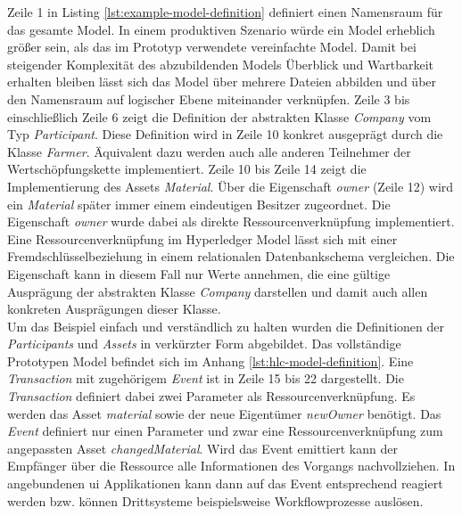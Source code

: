 \noindent
Zeile 1 in Listing \ref{lst:example-model-definition} definiert einen Namensraum für das gesamte Model. In einem produktiven Szenario würde ein Model erheblich größer sein, als das im Prototyp verwendete vereinfachte Model. Damit bei steigender Komplexität des abzubildenden Models Überblick und Wartbarkeit erhalten bleiben lässt sich das Model über mehrere Dateien abbilden und über den Namensraum auf logischer Ebene miteinander verknüpfen. Zeile 3 bis einschließlich Zeile 6 zeigt die Definition der abstrakten Klasse \textit{Company} vom Typ \textit{Participant}. Diese Definition wird in Zeile 10 konkret ausgeprägt durch die Klasse \textit{Farmer}. Äquivalent dazu werden auch alle anderen Teilnehmer der Wertschöpfungskette implementiert. Zeile 10 bis Zeile 14 zeigt die Implementierung des Assets \textit{Material}. Über die Eigenschaft \textit{owner} (Zeile 12) wird ein \textit{Material} später immer einem eindeutigen Besitzer zugeordnet. Die Eigenschaft \textit{owner} wurde dabei als direkte Ressourcenverknüpfung implementiert. Eine Ressourcenverknüpfung im Hyperledger Model lässt sich mit einer Fremdschlüsselbeziehung in einem relationalen Datenbankschema vergleichen. Die Eigenschaft kann in diesem Fall nur Werte annehmen, die eine gültige Ausprägung der abstrakten Klasse \textit{Company} darstellen und damit auch allen konkreten Ausprägungen dieser Klasse.\\

Um das Beispiel einfach und verständlich zu halten wurden die Definitionen der \textit{Participants} und \textit{Assets} in verkürzter Form abgebildet. Das vollständige Prototypen Model befindet sich im Anhang \ref{lst:hlc-model-definition}. Eine \textit{Transaction} mit zugehörigem \textit{Event} ist in Zeile 15 bis 22 dargestellt. Die \textit{Transaction} definiert dabei zwei Parameter als Ressourcenverknüpfung. Es werden das Asset \textit{material} sowie der neue Eigentümer \textit{newOwner} benötigt. Das \textit{Event} definiert nur einen Parameter und zwar eine Ressourcenverknüpfung zum angepassten Asset \textit{changedMaterial}. Wird das Event emittiert kann der Empfänger über die Ressource alle Informationen des Vorgangs nachvollziehen. In angebundenen \ac{ui} Applikationen kann dann auf das Event entsprechend reagiert werden bzw. können Drittsysteme beispielsweise Workflowprozesse auslösen.

